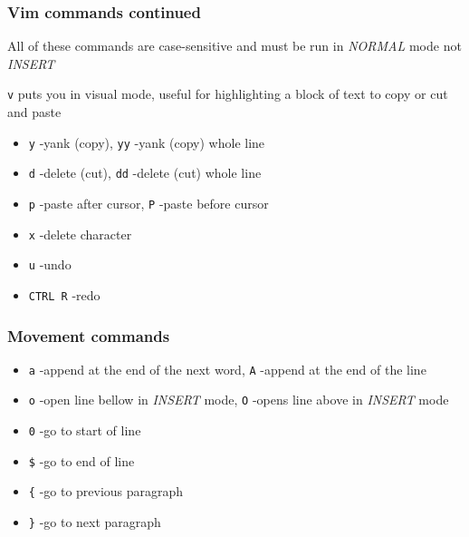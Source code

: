 \documentclass{beamer}
\begin{document}
\begin{frame}
    \frametitle{Vim commands continued}
    All of these commands are case-sensitive and must be run in \textit{NORMAL} mode not \textit{INSERT} 

    \texttt{v} puts you in visual mode, useful for highlighting a block of text to copy or cut and paste
    \begin{itemize}
        \item \texttt{y} -yank (copy), \texttt{yy} -yank (copy) whole line
        \item \texttt{d} -delete (cut), \texttt{dd} -delete (cut) whole line
        \item \texttt{p} -paste after cursor, \texttt{P} -paste before cursor
    \end{itemize}

    \begin{itemize}

        \item \texttt{x} -delete character
        \item \texttt{u} -undo
        \item \texttt{CTRL R} -redo
    \end{itemize}
\end{frame} 

\begin{frame}
    \frametitle{Movement commands}
    \begin{itemize}
    \item \texttt{a} -append at the end of the next word, \texttt{A} -append at the end of the line
    \item \texttt{o} -open line bellow in \textit{INSERT} mode, \texttt{O} -opens line above in \textit{INSERT} mode
    \item \texttt{0} -go to start of line
    \item \texttt{\$} -go to end of line
    \item \texttt{\{} -go to previous paragraph
    \item \texttt{\}} -go to next paragraph 
    \end{itemize}
\end{frame}
\end{document}
